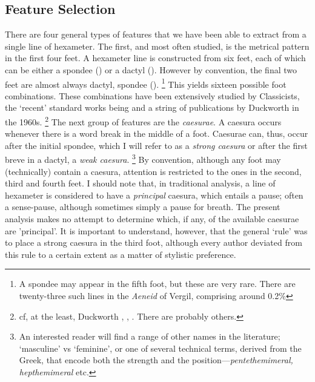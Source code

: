 \documentclass[11pt,a4paper]{scrartcl} %
\begin{document}
{\subsection{Feature Selection}
There are four general types of features that we have been able to extract from a single line of hexameter. The first, and most often studied, is the metrical pattern in the first four feet. A hexameter line is constructed from six feet, each of which can be either a spondee (\metricsymbols{_ _}) or a dactyl (). However by convention, the final two feet are almost always dactyl, spondee ().%
\footnote{A spondee may appear in the fifth foot, but these are very rare. There are twenty-three such lines in the \textit{Aeneid} of Vergil, comprising around 0.2\%}
This yields sixteen possible foot combinations. These combinations have been extensively studied by Classicists, the `recent' standard works being  and a string of publications by Duckworth in the 1960s.%
\footnote{cf, at the least, Duckworth , ,  . There are probably others.}
The next group of features are the \textit{caesurae}. A caesura occurs whenever there is a word break in the middle of a foot. Caesurae can, thus, occur after the initial spondee, which I will refer to as a \textit{strong caesura} or after the first breve in a dactyl, a \textit{weak caesura}.%
\footnote{An interested reader will find a range of other names in the literature; `masculine' vs `feminine', or one of several technical terms, derived from the Greek, that encode both the strength and the position---\textit{pentethemimeral, hepthemimeral} etc.}
By convention, although any foot may (technically) contain a caesura, attention is restricted to the ones in the second, third and fourth feet. I should note that, in traditional analysis, a line of hexameter is considered to have a \textit{principal} caesura, which entails a pause; often a sense-pause, although sometimes simply a pause for breath. The present analysis makes no attempt to determine which, if any, of the available caesurae are 'principal'. It is important to understand, however, that the general `rule' was to place a strong caesura in the third foot, although every author deviated from this rule to a certain extent as a matter of stylistic preference.

}
\end{document}
